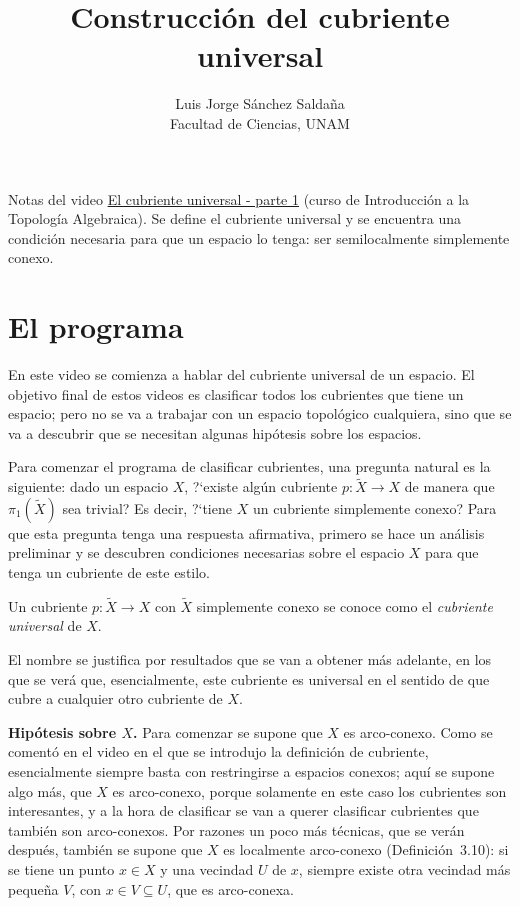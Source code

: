 \documentclass[11pt]{article}
\title{Construcción del cubriente universal}
\author{Luis Jorge Sánchez Saldaña\\[2pt]\small Facultad de Ciencias, UNAM}
\date{}
\begin{document}
\maketitle

\noindent\small Notas del video
\href{https://www.youtube.com/watch?v=6GBBu7gR3tY}{\guillemotleft{}El cubriente universal - parte 1\guillemotright{}}
(curso de Introducción a la Topología Algebraica). Se define el cubriente universal y se encuentra una condición necesaria para que un espacio lo tenga: ser semilocalmente simplemente conexo.
\normalsize

\section*{El programa}

En este video se comienza a hablar del cubriente universal de un espacio. El objetivo final de estos videos es clasificar todos los cubrientes que tiene un espacio; pero no se va a trabajar con un espacio topológico cualquiera, sino que se va a descubrir que se necesitan algunas hipótesis sobre los espacios.

Para comenzar el programa de clasificar cubrientes, una pregunta natural es la siguiente: dado un espacio $X$, ?`existe algún cubriente $p\colon\tilde X\to X$ de manera que $\pi_1(\tilde X)$ sea trivial? Es decir, ?`tiene $X$ un cubriente simplemente conexo? Para que esta pregunta tenga una respuesta afirmativa, primero se hace un análisis preliminar y se descubren condiciones necesarias sobre el espacio $X$ para que tenga un cubriente de este estilo.

\begin{defn}\label{def:cubriente-universal}
Un cubriente $p\colon\tilde X\to X$ con $\tilde X$ simplemente conexo se conoce como el \emph{cubriente universal} de $X$.
\end{defn}

El nombre se justifica por resultados que se van a obtener más adelante, en los que se verá que, esencialmente, este cubriente es universal en el sentido de que cubre a cualquier otro cubriente de $X$.

\medskip\noindent\textbf{Hipótesis sobre $X$.} Para comenzar se supone que $X$ es arco-conexo. Como se comentó en el video en el que se introdujo la definición de cubriente, esencialmente siempre basta con restringirse a espacios conexos; aquí se supone algo más, que $X$ es arco-conexo, porque solamente en este caso los cubrientes son interesantes, y a la hora de clasificar se van a querer clasificar cubrientes que también son arco-conexos. Por razones un poco más técnicas, que se verán después, también se supone que $X$ es localmente arco-conexo (Definición~3.10): si se tiene un punto $x\in X$ y una vecindad $U$ de $x$, siempre existe otra vecindad más pequeña $V$, con $x\in V\subseteq U$, que es arco-conexa.
\end{document}
